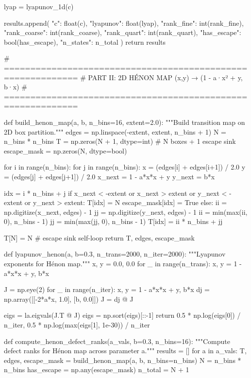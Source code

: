 {{{{{{{{{{{{{        lyap = lyapunov_1d(c)
        
        results.append({
            "c": float(c),
            "lyapunov": float(lyap),
            "rank_fine": int(rank_fine),
            "rank_coarse": int(rank_coarse),
            "rank_quart": int(rank_quart),
            "has_escape": bool(has_escape),
            "n_states": n_total
        })
    return results


# ============================================================
# PART II: 2D HÉNON MAP  (x,y) → (1 - a·x² + y, b·x)
# ============================================================

def build_henon_map(a, b, n_bins=16, extent=2.0):
    """Build transition map on 2D box partition."""
    edges = np.linspace(-extent, extent, n_bins + 1)
    N = n_bins * n_bins
    T = np.zeros(N + 1, dtype=int)  # N boxes + 1 escape sink
    escape_mask = np.zeros(N, dtype=bool)
    
    for i in range(n_bins):
        for j in range(n_bins):
            x = (edges[i] + edges[i+1]) / 2.0
            y = (edges[j] + edges[j+1]) / 2.0
            x_next = 1 - a*x*x + y
            y_next = b*x
            
            idx = i * n_bins + j
            if x_next < -extent or x_next > extent or y_next < -extent or y_next > extent:
                T[idx] = N
                escape_mask[idx] = True
            else:
                ii = np.digitize(x_next, edges) - 1
                jj = np.digitize(y_next, edges) - 1
                ii = min(max(ii, 0), n_bins - 1)
                jj = min(max(jj, 0), n_bins - 1)
                T[idx] = ii * n_bins + jj
    
    T[N] = N  # escape sink self-loop
    return T, edges, escape_mask


def lyapunov_henon(a, b=0.3, n_trans=2000, n_iter=2000):
    """Lyapunov exponents for Hénon map."""
    x, y = 0.0, 0.0
    for _ in range(n_trans):
        x, y = 1 - a*x*x + y, b*x
    
    J = np.eye(2)
    for _ in range(n_iter):
        x, y = 1 - a*x*x + y, b*x
        dj = np.array([[-2*a*x, 1.0], [b, 0.0]])
        J = dj @ J
    
    eigs = la.eigvals(J.T @ J)
    eigs = np.sort(eigs)[::-1]
    return 0.5 * np.log(eigs[0]) / n_iter, 0.5 * np.log(max(eigs[1], 1e-30)) / n_iter


def compute_henon_defect_ranks(a_vals, b=0.3, n_bins=16):
    """Compute defect ranks for Hénon map across parameter a."""
    results = []
    for a in a_vals:
        T, edges, escape_mask = build_henon_map(a, b, n_bins=n_bins)
        N = n_bins * n_bins
        has_escape = np.any(escape_mask)
        n_total = N + 1
        
}}}}}}}}}}}}}
